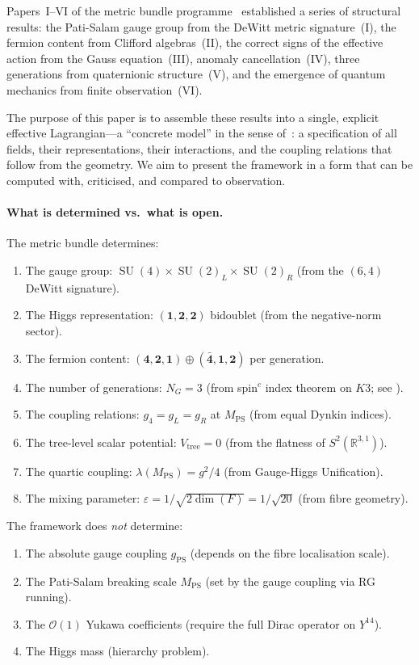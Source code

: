 \documentclass[12pt,a4paper]{article}
\theoremstyle{definition}
\newcommand{\SU}{\operatorname{SU}}
\newcommand{\R}{\mathbb{R}}
\newcommand{\MPS}{M_{\mathrm{PS}}}
\newcommand{\gPS}{g_{\mathrm{PS}}}
\begin{document}
Papers~I--VI of the metric bundle programme~\cite{Paper1,Paper2,Paper3,Paper4,Paper5,Paper6} established a series of structural results: the Pati-Salam gauge group from the DeWitt metric signature~(I), the fermion content from Clifford algebras~(II), the correct signs of the effective action from the Gauss equation~(III), anomaly cancellation~(IV), three generations from quaternionic structure~(V), and the emergence of quantum mechanics from finite observation~(VI).

The purpose of this paper is to assemble these results into a single, explicit effective Lagrangian---a ``concrete model'' in the sense of~\cite{KrasnovPercacci2018}: a specification of all fields, their representations, their interactions, and the coupling relations that follow from the geometry.
We aim to present the framework in a form that can be computed with, criticised, and compared to observation.

\paragraph{What is determined vs.\ what is open.}
The metric bundle determines:
\begin{enumerate}[nosep]
\item The gauge group: $\SU(4) \times \SU(2)_L \times \SU(2)_R$ (from the $(6,4)$ DeWitt signature).
\item The Higgs representation: $(\mathbf{1},\mathbf{2},\mathbf{2})$ bidoublet (from the negative-norm sector).
\item The fermion content: $(\mathbf{4},\mathbf{2},\mathbf{1}) \oplus (\bar{\mathbf{4}},\mathbf{1},\mathbf{2})$ per generation.
\item The number of generations: $N_G = 3$ (from spin$^c$ index theorem on $K3$; see ).
\item The coupling relations: $g_4 = g_L = g_R$ at $\MPS$ (from equal Dynkin indices).
\item The tree-level scalar potential: $V_{\mathrm{tree}} = 0$ (from the flatness of $S^2(\R^{3,1})$).
\item The quartic coupling: $\lambda(\MPS) = g^2/4$ (from Gauge-Higgs Unification).
\item The mixing parameter: $\varepsilon = 1/\sqrt{2\dim(F)} = 1/\sqrt{20}$ (from fibre geometry).
\end{enumerate}

The framework does \emph{not} determine:
\begin{enumerate}[nosep, label=(\alph*)]
\item The absolute gauge coupling $\gPS$ (depends on the fibre localisation scale).
\item The Pati-Salam breaking scale $\MPS$ (set by the gauge coupling via RG running).
\item The $\mathcal{O}(1)$ Yukawa coefficients (require the full Dirac operator on $Y^{14}$).
\item The Higgs mass (hierarchy problem).
\end{enumerate}
\end{document}
